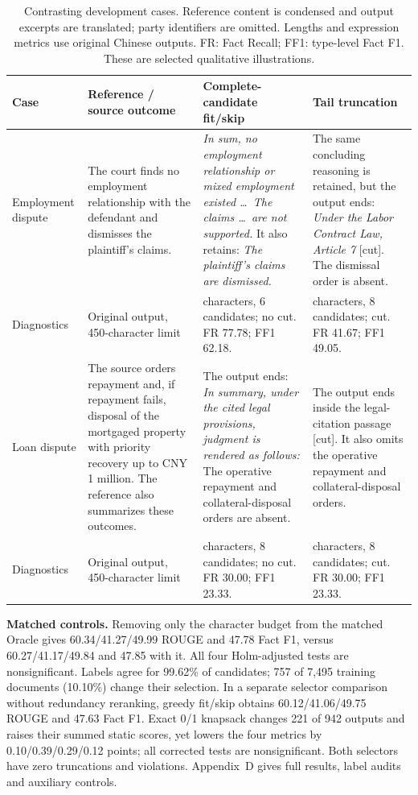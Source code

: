\documentclass[10pt,twocolumn,letterpaper]{article}
\begin{document}
\begin{table}[!t]
\caption{Contrasting development cases. Reference content is condensed and output excerpts are translated; party identifiers are omitted. Lengths and expression metrics use original Chinese outputs. FR: Fact Recall; FF1: type-level Fact F1. These are selected qualitative illustrations.}\label{tab:cases}
\small
\begin{tabularx}{\textwidth}{@{}>{\raggedright\arraybackslash}p{}>{\raggedright\arraybackslash}p{}>{\raggedright\arraybackslash}X>{\raggedright\arraybackslash}X@{}}
\toprule
\textbf{Case} & \textbf{Reference / source outcome} & \textbf{Complete-candidate fit/skip} & \textbf{Tail truncation} \\
\midrule
Employment dispute &
The court finds no employment relationship with the defendant and dismisses the plaintiff's claims. &
\emph{In sum, no employment relationship or mixed employment existed \ldots\ The claims \ldots\ are not supported.} It also retains: \emph{The plaintiff's claims are dismissed.} &
The same concluding reasoning is retained, but the output ends: \emph{Under the Labor Contract Law, Article 7} [cut]. The dismissal order is absent. \\
\addlinespace
Diagnostics & Original output, 450-character limit &
450 characters, 6 candidates; no cut. FR 77.78; FF1 62.18. &
450 characters, 8 candidates; cut. FR 41.67; FF1 49.05. \\
\midrule
Loan dispute &
The source orders repayment and, if repayment fails, disposal of the mortgaged property with priority recovery up to CNY 1 million. The reference also summarizes these outcomes. &
The output ends: \emph{In summary, under the cited legal provisions, judgment is rendered as follows:} The operative repayment and collateral-disposal orders are absent. &
The output ends inside the legal-citation passage [cut]. It also omits the operative repayment and collateral-disposal orders. \\
\addlinespace
Diagnostics & Original output, 450-character limit &
444 characters, 8 candidates; no cut. FR 30.00; FF1 23.33. &
450 characters, 8 candidates; cut. FR 30.00; FF1 23.33. \\
\bottomrule
\end{tabularx}
\end{table}

\textbf{Matched controls.} Removing only the character budget from the matched Oracle gives 60.34/41.27/49.99 ROUGE and 47.78 Fact F1, versus 60.27/41.17/49.84 and 47.85 with it. All four Holm-adjusted tests are nonsignificant. Labels agree for 99.62\% of candidates; 757 of 7,495 training documents (10.10\%) change their selection. In a separate selector comparison without redundancy reranking, greedy fit/skip obtains 60.12/41.06/49.75 ROUGE and 47.63 Fact F1. Exact 0/1 knapsack changes 221 of 942 outputs and raises their summed static scores, yet lowers the four metrics by 0.10/0.39/0.29/0.12 points; all corrected tests are nonsignificant. Both selectors have zero truncations and violations. Appendix~D gives full results, label audits and auxiliary controls.
\end{document}

